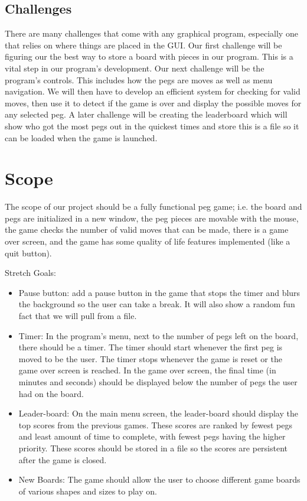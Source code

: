 \documentclass[10pt,conference,onecolumn,compsoc]{IEEEtran}
\begin{document}
\subsection{Challenges}
There are many challenges that come with any graphical program, especially one that relies on where things are placed in the GUI. Our first challenge will be figuring our the best way to store a board with pieces in our program. This is a vital step in our program's development. Our next challenge will be the program's controls. This includes how the pegs are moves as well as menu navigation. We will then have to develop an efficient system for checking for valid moves, then use it to detect if the game is over and display the possible moves for any selected peg. A later challenge will be creating the leaderboard which will show who got the most pegs out in the quickest times and store this is a file so it can be loaded when the game is launched.


\section{Scope}
The scope of our project should be a fully functional peg game; i.e. the board and pegs are initialized in a new window, the peg pieces are movable with the mouse, the game checks the number of valid moves that can be made, there is a game over screen, and the game has some quality of life features implemented (like a quit button).\newline

Stretch Goals:
\begin{itemize}
\item Pause button: add a pause button in the game that stops the timer and blurs the background so the user can take a break. It will also show a random fun fact that we will pull from a file.
\item Timer: In the program's menu, next to the number of pegs left on the board, there should be a timer. The timer should start whenever the first peg is moved to be the user. The timer stops whenever the game is reset or the game over screen is reached. In the game over screen, the final time (in minutes and seconds) should be displayed below the number of pegs the user had on the board.
\item Leader-board: On the main menu screen, the leader-board should display the top scores from the previous games. These scores are ranked by fewest pegs and least amount of time to complete, with fewest pegs having the higher priority. These scores should be stored in a file so the scores are persistent after the game is closed.
\item New Boards: The game should allow the user to choose different game boards of various shapes and sizes to play on.
\end{itemize}
\end{document}

